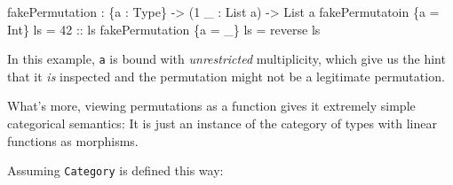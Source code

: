 \documentclass[
]{article}
\newenvironment{Shaded}{}{}
\newcommand{\DataTypeTok}[1]{\textcolor[rgb]{0.56,0.13,0.00}{#1}}
\newcommand{\DecValTok}[1]{\textcolor[rgb]{0.25,0.63,0.44}{#1}}
\newcommand{\FunctionTok}[1]{\textcolor[rgb]{0.02,0.16,0.49}{#1}}
\newcommand{\NormalTok}[1]{#1}
\newcommand{\OperatorTok}[1]{\textcolor[rgb]{0.40,0.40,0.40}{#1}}
\newcommand{\OtherTok}[1]{\textcolor[rgb]{0.00,0.44,0.13}{#1}}
\begin{document}
\begin{Shaded}
\begin{Highlighting}[]
\NormalTok{fakePermutation }\OperatorTok{:}\NormalTok{ \{a }\OperatorTok{:} \DataTypeTok{Type}\NormalTok{\} }\OtherTok{{-}\textgreater{}}\NormalTok{ (}\DecValTok{1}\NormalTok{ \_ }\OperatorTok{:} \DataTypeTok{List}\NormalTok{ a) }\OtherTok{{-}\textgreater{}} \DataTypeTok{List}\NormalTok{ a}
\NormalTok{fakePermutatoin \{a }\OtherTok{=} \DataTypeTok{Int}\NormalTok{\} ls }\OtherTok{=} \DecValTok{42}\OtherTok{ ::}\NormalTok{ ls}
\NormalTok{fakePermutation \{a }\OtherTok{=}\NormalTok{ \_\} ls }\OtherTok{=} \FunctionTok{reverse}\NormalTok{ ls}
\end{Highlighting}
\end{Shaded}

In this example, \texttt{a} is bound with \emph{unrestricted}
multiplicity, which give us the hint that it \emph{is} inspected and the
permutation might not be a legitimate permutation.

What's more, viewing permutations as a function gives it extremely
simple categorical semantics: It is just an instance of the category of
types with linear functions as morphisms.

Assuming \texttt{Category} is defined this way:
\end{document}
